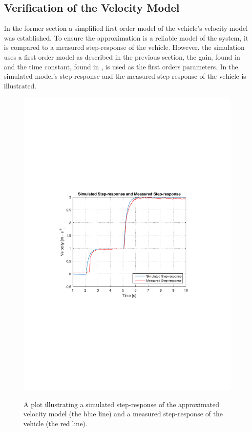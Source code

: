 \subsection{Verification of the Velocity Model}
In the former section a simplified first order model of the vehicle's velocity model was established. To ensure the approximation is a reliable model of the system, it is compared to a measured step-response of the vehicle. However, the simulation uses a first order model as described in the previous section, the gain, found in  and the time constant, found in , is used as the first orders parameters. In  the simulated model's step-response and the measured step-response of the vehicle is illustrated. 
%
\begin{figure}[H]
  \centering
  {
    \includegraphics[width=1.4\textwidth]{figures/SimulationIRLsteprespons2.pdf}
  }
  \caption{A plot illustrating a simulated step-response of the approximated velocity model (the blue line) and a measured step-response of the vehicle (the red line).}
  \label{SimulationIRLsteprespons2}
\end{figure}
